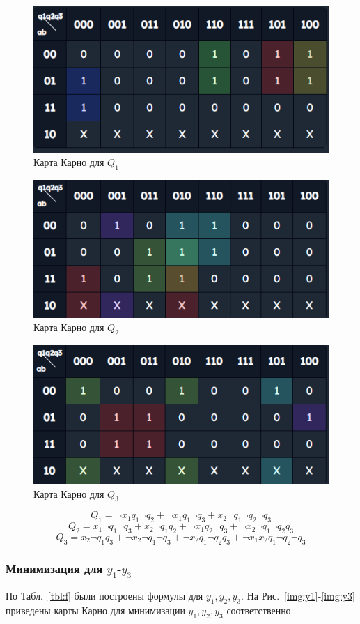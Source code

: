 \documentclass[a4paper, final]{article}
\begin{document}
\begin{figure}[H]
   \centering
   \includegraphics[width=0.7\linewidth]{q1.png}
   \caption{Карта Карно для $Q_1$}
   \label{img:q1}
\end{figure}

\begin{figure}[H]
  \centering
  \includegraphics[width=0.7\linewidth]{q2.png}
  \caption{Карта Карно для $Q_2$}
  \label{img:q2}
\end{figure}

\begin{figure}[H]
  \centering
  \includegraphics[width=0.7\linewidth]{q3.png}
  \caption{Карта Карно для $Q_3$}
  \label{img:q3}
\end{figure}


\[Q_1 = \neg x_1 q_1 \neg q_2 + \neg x_1 q_1 \neg q_3 + x_2 \neg q_1 \neg q_2 \neg q_3\]
\[Q_2 = x_1 \neg q_1 \neg q_3 + x_2 \neg q_1 q_2 + \neg x_1 q_2 \neg q_3 + \neg x_2 \neg q_1 \neg q_2 q_3\]
\[Q_3 = x_2 \neg q_1 q_3 + \neg x_2 \neg q_1 \neg q_3 + \neg x_2 q_1 \neg q_2 q_3 + \neg x_1 x_2 q_1 \neg q_2 \neg q_3\]

\subsubsection{Минимизация для $y_1$-$y_3$}
По Табл.~\ref{tbl:f} были построены формулы для $y_1, y_2, y_3$. На Рис.~\ref{img:y1}-\ref{img:y3} приведены карты Карно для минимизации $y_1, y_2, y_3$ соответственно.
\end{document}
